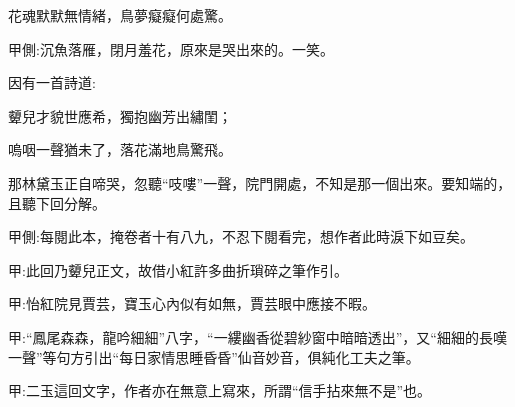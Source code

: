 \begin{poem}
    \begin{pl}花魂默默無情緒，鳥夢癡癡何處驚。\end{pl}\begin{note}甲側:沉魚落雁，閉月羞花，原來是哭出來的。一笑。\end{note}
\end{poem}


\begin{parag}
    因有一首詩道:
\end{parag}


\begin{poem}
    \begin{pl}顰兒才貌世應希，獨抱幽芳出繡閨；\end{pl}

    \begin{pl}嗚咽一聲猶未了，落花滿地鳥驚飛。\end{pl}
\end{poem}


\begin{parag}
    那林黛玉正自啼哭，忽聽“吱嘍”一聲，院門開處，不知是那一個出來。要知端的，且聽下回分解。\begin{note}甲側:每閱此本，掩卷者十有八九，不忍下閱看完，想作者此時淚下如豆矣。\end{note}
\end{parag}


\begin{parag}
    \begin{note}甲:此回乃顰兒正文，故借小紅許多曲折瑣碎之筆作引。\end{note}
\end{parag}


\begin{parag}
    \begin{note}甲:怡紅院見賈芸，寶玉心內似有如無，賈芸眼中應接不暇。\end{note}
\end{parag}


\begin{parag}
    \begin{note}甲:“鳳尾森森，龍吟細細”八字，“一縷幽香從碧紗窗中暗暗透出”，又“細細的長嘆一聲”等句方引出“每日家情思睡昏昏”仙音妙音，俱純化工夫之筆。\end{note}
\end{parag}


\begin{parag}
    \begin{note}甲:二玉這回文字，作者亦在無意上寫來，所謂“信手拈來無不是”也。\end{note}
\end{parag}


